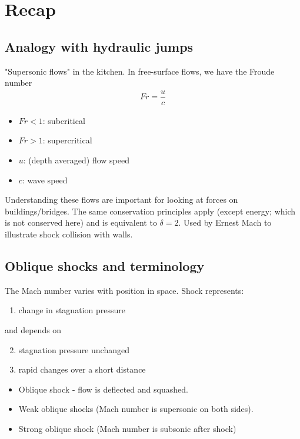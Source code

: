 \documentclass[class=report, crop=false, 12pt,a4paper]{standalone}
\begin{document}
\section{Recap}
\subsection{Analogy with hydraulic jumps}
"Supersonic flows" in the kitchen. In free-surface flows, we have the Froude number
\begin{gather}
    Fr = \dfrac{u}{c}
\end{gather}
\begin{itemize}[noitemsep]
    \item $Fr < 1$: subcritical
    \item $Fr > 1$: supercritical
    \item $u$: (depth averaged) flow speed
    \item $c$: wave speed
\end{itemize}
Understanding these flows are important for looking at forces on buildings/bridges. The same conservation principles apply (except energy; which is not conserved here) and is equivalent to $\delta = 2$. Used by Ernest Mach to illustrate shock collision with walls.
\subsection{Oblique shocks and terminology}
The Mach number varies with position in space. Shock represents:
\begin{enumerate}
    \item change in stagnation pressure
\end{enumerate}
and depends on
\begin{enumerate}
    \setcounter{enumi}{1}
    \item stagnation pressure unchanged
    \item rapid changes over a short distance
\end{enumerate}
\begin{itemize}[noitemsep]
    \item Oblique shock - flow is deflected and squashed.
    \item Weak oblique shocks (Mach number is supersonic on both sides).
    \item Strong oblique shock (Mach number is subsonic after shock)
\end{itemize}
\end{document}
